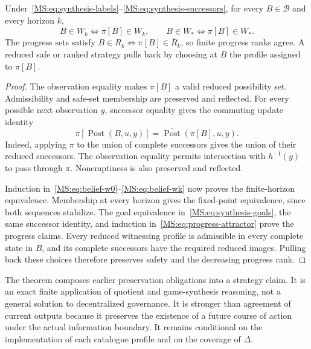\begin{MStheorem}\label{MS:thm:synthesis-transport}
Under~\eqref{MS:eq:synthesis-labels}--\eqref{MS:eq:synthesis-successors}, for every $B\in\mathcal B$ and every horizon $k$,
\[
B\in W_k\Longleftrightarrow\pi[B]\in\overline W_k,
\qquad
B\in W_*\Longleftrightarrow\pi[B]\in\overline W_*.
\]
The progress sets satisfy $B\in R_k\Longleftrightarrow\pi[B]\in\overline R_k$, so finite progress ranks agree. A reduced safe or ranked strategy pulls back by choosing at $B$ the profile assigned to $\pi[B]$.
\end{MStheorem}
\begin{proof}
The observation equality makes $\pi[B]$ a valid reduced possibility set. Admissibility and safe-set membership are preserved and reflected. For every possible next observation $y$, successor equality gives the commuting update identity
\begin{equation}\label{MS:eq:synthesis-post-commute}
\pi[\operatorname{Post}(B,u,y)]
=\overline{\operatorname{Post}}(\pi[B],u,y).
\end{equation}
Indeed, applying $\pi$ to the union of complete successors gives the union of their reduced successors. The observation equality permits intersection with $h^{-1}(y)$ to pass through $\pi$. Nonemptiness is also preserved and reflected.

Induction in~\eqref{MS:eq:belief-w0}--\eqref{MS:eq:belief-wk} now proves the finite-horizon equivalence. Membership at every horizon gives the fixed-point equivalence, since both sequences stabilize. The goal equivalence in~\eqref{MS:eq:synthesis-goals}, the same successor identity, and induction in~\eqref{MS:eq:progress-attractor} prove the progress claims. Every reduced witnessing profile is admissible in every complete state in $B$, and its complete successors have the required reduced images. Pulling back these choices therefore preserves safety and the decreasing progress rank.
\end{proof}

The theorem composes earlier preservation obligations into a strategy claim. It is an exact finite application of quotient and game-synthesis reasoning, not a general solution to decentralized governance. It is stronger than agreement of current outputs because it preserves the existence of a future course of action under the actual information boundary. It remains conditional on the implementation of each catalogue profile and on the coverage of $\Delta$.

